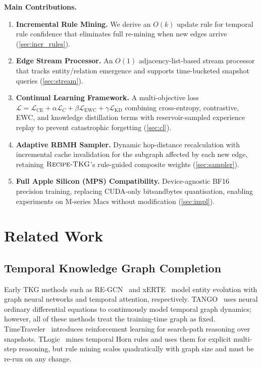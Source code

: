 \documentclass[10pt,twocolumn]{article}
\theoremstyle{definition}
\newcommand{\recipe}{\textsc{Recipe-TKG}}
\newcommand{\calL}{\mathcal{L}}
\begin{document}
\medskip
\noindent\textbf{Main Contributions.}\quad
\begin{enumerate}[leftmargin=1.5em,itemsep=2pt,topsep=4pt]
  \item \textbf{Incremental Rule Mining.} We derive an $O(k)$ update rule for
        temporal rule confidence that eliminates full re-mining when new edges
        arrive (\cref{sec:incr_rules}).
  \item \textbf{Edge Stream Processor.} An $O(1)$ adjacency-list-based stream
        processor that tracks entity/relation emergence and supports
        time-bucketed snapshot queries (\cref{sec:stream}).
  \item \textbf{Continual Learning Framework.} A multi-objective loss
        $\calL = \calL_{\text{CE}} + \alpha\calL_C + \beta\calL_{\text{EWC}}
        + \gamma\calL_{\text{KD}}$
        combining cross-entropy, contrastive, EWC, and knowledge distillation
        terms with reservoir-sampled experience replay to prevent catastrophic
        forgetting (\cref{sec:cl}).
  \item \textbf{Adaptive RBMH Sampler.} Dynamic hop-distance recalculation
        with incremental cache invalidation for the subgraph affected by each
        new edge, retaining $\recipe{}$'s rule-guided composite weights
        (\cref{sec:sampler}).
  \item \textbf{Full Apple Silicon (MPS) Compatibility.} Device-agnostic
        BF16 precision training, replacing CUDA-only bitsandbytes quantisation,
        enabling experiments on M-series Macs without modification
        (\cref{sec:impl}).
\end{enumerate}

\section{Related Work}
\label{sec:related}

\subsection{Temporal Knowledge Graph Completion}

Early TKG methods such as RE-GCN~\citep{Li2021regcn} and
xERTE~\citep{Han2020xerte} model entity evolution with graph neural networks
and temporal attention, respectively.
TANGO~\citep{Han2021tango} uses neural ordinary differential equations to
continuously model temporal graph dynamics; however, all of these methods
treat the training-time graph as fixed.
TimeTraveler~\citep{Sun2021timetraveler} introduces reinforcement learning for
search-path reasoning over snapshots.
TLogic~\citep{Liu2022tlogic} mines temporal Horn rules and uses them for
explicit multi-step reasoning, but rule mining scales quadratically with
graph size and must be re-run on any change.
\end{document}
